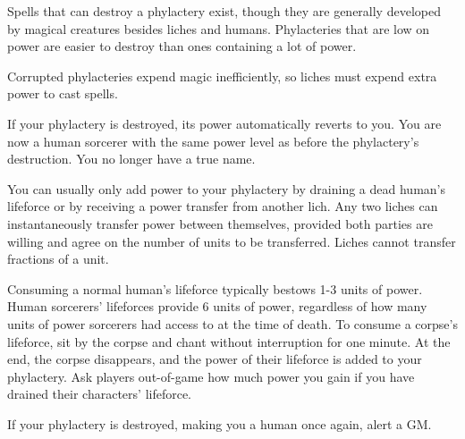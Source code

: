 \documentclass[green]{Sel}
\begin{document}
Spells that can destroy a phylactery exist, though they are generally developed by magical creatures besides liches and humans. Phylacteries that are low on power are easier to destroy than ones containing a lot of power.

Corrupted phylacteries expend magic inefficiently, so liches must expend extra power to cast spells.

If your phylactery is destroyed, its power automatically reverts to you. You are now a human sorcerer with the same power level as before the phylactery’s destruction. You no longer have a true name.

You can usually only add power to your phylactery by draining a dead human’s lifeforce or by receiving a power transfer from another lich. Any two liches can instantaneously transfer power between themselves, provided both parties are willing and agree on the number of units to be transferred. Liches cannot transfer fractions of a unit.

Consuming a normal human’s lifeforce typically bestows 1-3 units of power. Human sorcerers’ lifeforces provide 6 units of power, regardless of how many units of power sorcerers had access to at the time of death. To consume a corpse’s lifeforce, sit by the corpse and chant without interruption for one minute. At the end, the corpse disappears, and the power of their lifeforce is added to your phylactery. Ask players out-of-game how much power you gain if you have drained their characters’ lifeforce.

If your phylactery is destroyed, making you a human once again, alert a GM.
\end{document}
